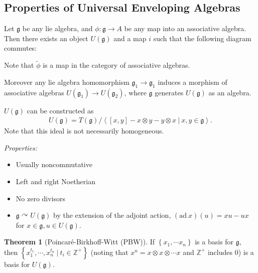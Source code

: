 \documentclass[11pt]{scrartcl}
\theoremstyle{definition}
\theoremstyle{theorem}
\newtheorem{theorem}{Theorem}[section]
\theoremstyle{proof}
\theoremstyle{definition}
\theoremstyle{break}
\theoremstyle{problem}
\providecommand{\tightlist}{%
  \setlength{\itemsep}{0pt}\setlength{\parskip}{0pt}}
\newcommand{\ZZ}[0]{{\mathbb{Z}}}
\newcommand{\ad}[0]{\mathrm{ad}~}
\newcommand{\actson}[0]{\curvearrowright}
\newcommand{\generators}[1]{\left\langle{#1}\right\rangle}
\newcommand{\lieg}[0]{{\mathfrak{g}}}
\newcommand{\suchthat}[0]{{~\mathrel{\Big|}~}}
\newcommand{\tensor}[0]{\otimes}
\newcommand{\theset}[1]{\left\{{#1}\right\}}
\renewcommand{\to}[0]{\longrightarrow}
\begin{document}
\hypertarget{properties-of-universal-enveloping-algebras}{%
\subsection{Properties of Universal Enveloping
Algebras}\label{properties-of-universal-enveloping-algebras}}

Let \(\lieg\) be any lie algebra, and \(\phi: \lieg \to A\) be any map
into an associative algebra. Then there exists an object \(U(\lieg)\)
and a map \(i\) such that the following diagram commutes:

\begin{center}
\end{center}

Note that \(\tilde \phi\) is a map in the category of associative
algebras.

Moreover any lie algebra homomorphism \(\lieg_1 \to \lieg_1\) induces a
morphism of associative algebras \(U(\lieg_1) \to U(\lieg_2)\), where
\(\lieg\) generates \(U(\lieg)\) as an algebra.

\(U(\lieg)\) can be constructed as
\begin{align*}
U(\lieg) = T(\lieg)/ \generators{ [x,y] - x\tensor y - y\tensor x \suchthat x,y\in\lieg}
.\end{align*} Note that this ideal is not necessarily homogeneous.

\emph{Properties:}

\begin{itemize}
\tightlist
\item
  Usually noncommutative
\item
  Left and right Noetherian
\item
  No zero divisors
\item
  \(\lieg \actson U(\lieg)\) by the extension of the adjoint action,
  \((\ad x)(u) = xu - ux\) for \(x\in \lieg, u\in U(\lieg)\).
\end{itemize}

\begin{theorem}[Poincaré-Birkhoff-Witt (PBW)]

If \(\theset{x_1, \cdots x_n}\) is a basis for \(\lieg\), then
\(\theset{x_1^{t_1}, \cdots, x_n^{t_n} \suchthat t_i \in \ZZ^+}\)
(noting that \(x^n = x\tensor x \tensor \cdots x\) and \(\ZZ^+\)
includes 0) is a basis for \(U(\lieg)\).\end{theorem}
\end{document}
